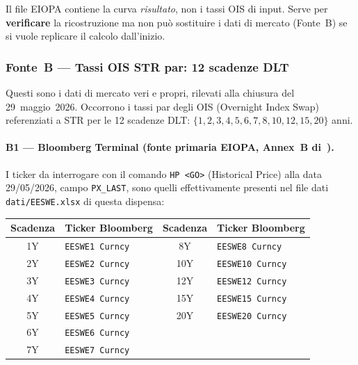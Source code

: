 \documentclass[11pt,a4paper]{article}
\theoremstyle{plain}
\theoremstyle{definition}
\theoremstyle{remark}
\begin{document}
\begin{warningbox}
Il file EIOPA contiene la curva \emph{risultato}, non i tassi OIS di input.
Serve per \textbf{verificare} la ricostruzione ma non pu\`o sostituire i dati
di mercato (Fonte~B) se si vuole replicare il calcolo dall'inizio.
\end{warningbox}

\subsubsection*{Fonte~B --- Tassi OIS \texteuro{}STR par: 12 scadenze DLT}

Questi sono i dati di mercato veri e propri, rilevati alla chiusura del
29~maggio~2026. Occorrono i tassi par degli OIS (Overnight Index Swap)
referenziati a \texteuro{}STR per le 12 scadenze DLT:
$\{1,2,3,4,5,6,7,8,10,12,15,20\}$ anni.

\paragraph{B1 --- Bloomberg Terminal (fonte primaria EIOPA, Annex~B di~\cite{eiopa2025}).}
I ticker da interrogare con il comando \texttt{HP <GO>} (Historical Price)
alla data 29/05/2026, campo \texttt{PX\_LAST}, sono quelli effettivamente presenti
nel file dati \texttt{dati/EESWE.xlsx} di questa dispensa:

\begin{center}\small
\renewcommand{\arraystretch}{1.2}
\begin{tabular}{clcl}
\toprule
\textbf{Scadenza} & \textbf{Ticker Bloomberg} & \textbf{Scadenza} & \textbf{Ticker Bloomberg} \\
\midrule
1Y  & \texttt{EESWE1 Curncy}  & 8Y  & \texttt{EESWE8 Curncy}  \\
2Y  & \texttt{EESWE2 Curncy}  & 10Y & \texttt{EESWE10 Curncy} \\
3Y  & \texttt{EESWE3 Curncy}  & 12Y & \texttt{EESWE12 Curncy} \\
4Y  & \texttt{EESWE4 Curncy}  & 15Y & \texttt{EESWE15 Curncy} \\
5Y  & \texttt{EESWE5 Curncy}  & 20Y & \texttt{EESWE20 Curncy} \\
6Y  & \texttt{EESWE6 Curncy}  &     &                          \\
7Y  & \texttt{EESWE7 Curncy}  &     &                          \\
\bottomrule
\end{tabular}
\end{center}
\end{document}
